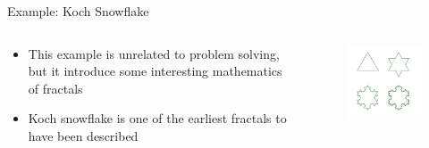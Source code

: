 \documentclass[10pt,xcolor={table,dvipsnames},t]{beamer}
\begin{document}
\begin{frame}{Example: Koch Snowflake}
  \begin{columns}
    \begin{column}[T]{0.6\textwidth}
      \begin{itemize}
        \item This example is unrelated to problem solving, but it introduce some interesting mathematics of fractals
        \item Koch snowflake is one of the earliest fractals to have been described
      \end{itemize}
    \end{column}
    \begin{column}[T]{0.4\textwidth}
      \begin{figure}
        \includegraphics[width=\textwidth]{img/koch_snowflake.png}
      \end{figure}
    \end{column}
  \end{columns}
\end{frame}
\end{document}
